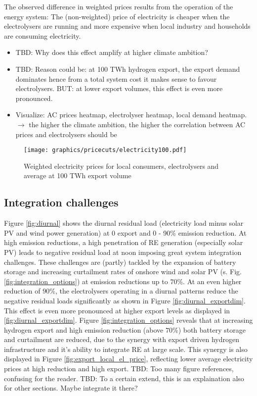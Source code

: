 The observed difference in weighted prices results from the operation of the energy system: The (non-weighted) price of electricity is cheaper when the electrolysers are running and more expensive when local industry and households are consuming electricity.
\begin{itemize}
    \item TBD: Why does this effect amplify at higher climate ambition?
    \item TBD: Reason could be: at 100 TWh hydrogen export, the export demand dominates hence from a total system cost it makes sense to favour electrolysers. BUT: at lower export volumes, this effect is even more pronounced.
    \item Visualize: AC prices heatmap, electrolyser heatmap, local demand heatmap. $\rightarrow$ the higher the climate ambition, the higher the correlation between AC prices and electrolysers should be
\end{itemize}



\begin{figure}[h!]
    \centering
    \texttt{[image: graphics/pricecuts/electricity100.pdf]}
    \caption{Weighted electricity prices for local consumers, electrolysers and average at 100 TWh export volume}
    \label{fig:pricecut}
\end{figure}



\subsection{Integration challenges}
\label{subsec:integration_challenges}
Figure \ref{fig:diurnal} shows the diurnal residual load (electricity load minus solar PV and wind power generation) at 0 export and 0 - 90\% emission reduction. At high emission reductions, a high penetration of RE generation (especially solar PV) leads to negative residual load at noon imposing great system integration challenges.
These challenges are (partly) tackled by the expansion of battery storage and increasing curtailment rates of onshore wind and solar PV (s. Fig. \ref{fig:integration_options}) at emission reductions up to $70$\%. At an even higher reduction of $90$\%, the electrolysers operating in a diurnal patterns reduce the negative residual loads significantly as shown in Figure \ref{fig:diurnal_exportdim}. This effect is even more pronounced at higher export levels as displayed in \ref{fig:diurnal_exportdim}. 
Figure \ref{fig:integration_options} reveals that at increasing hydrogen export and high emission reduction (above $70$\%) both battery storage and curtailment are reduced, due to the synergy with export driven hydrogen infrastructure and it's ability to integrate RE at large scale. This synergy is also displayed in Figure \ref{fig:export_local_el_price}, reflecting lower average electricity prices at high reduction and high export.
TBD: Too many figure references, confusing for the reader.
TBD: To a certain extend, this is an explaination also for other sections. Maybe integrate it there?

